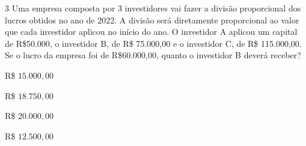 
\num{3} Uma empresa composta por 3 investidores vai fazer a divisão
proporcional dos lucros obtidos no ano de 2022. A divisão será
diretamente proporcional ao valor que cada investidor aplicou no início
do ano. O investidor A aplicou um capital de R\$50.000, o investidor B,
de R\$ 75.000,00 e o investidor C, de R\$ 115.000,00. Se o lucro da
empresa foi de R\$60.000,00, quanto o investidor B deverá receber?

\begin{escolha}[itemsep=0pt]
\item R\$ $15.000,00$
\item R\$ $18.750,00$
\item R\$ $20.000,00$
\item R\$ $12.500,00$
\end{escolha}




